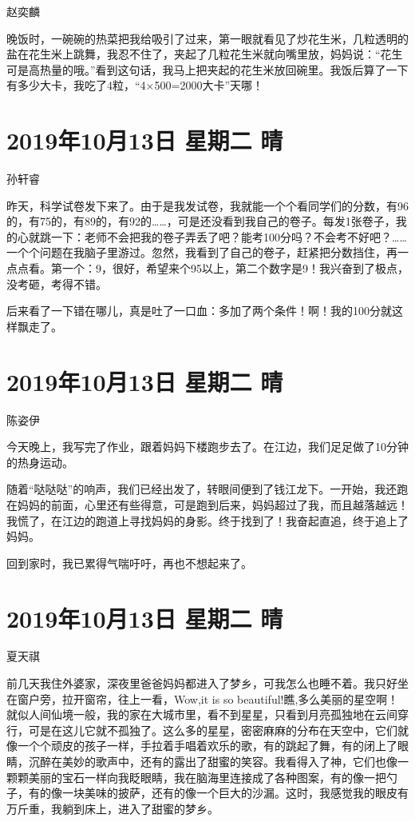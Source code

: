 赵奕麟

晚饭时，一碗碗的热菜把我给吸引了过来，第一眼就看见了炒花生米，几粒透明的盐在花生米上跳舞，我忍不住了，夹起了几粒花生米就向嘴里放，妈妈说：``花生可是高热量的哦。''看到这句话，我马上把夹起的花生米放回碗里。我饭后算了一下有多少大卡，我吃了4粒，``4×500=2000大卡''天哪！

\section{2019年10月13日 星期二 晴}

孙轩睿

昨天，科学试卷发下来了。由于是我发试卷，我就能一个个看同学们的分数，有96的，有75的，有89的，有92的\ldots\ldots，可是还没看到我自己的卷子。每发1张卷子，我的心就跳一下：老师不会把我的卷子弄丢了吧？能考100分吗？不会考不好吧？\ldots\ldots 一个个问题在我脑子里游过。忽然，我看到了自己的卷子，赶紧把分数挡住，再一点点看。第一个：9，很好，希望来个95以上，第二个数字是9！我兴奋到了极点，没考砸，考得不错。

后来看了一下错在哪儿，真是吐了一口血：多加了两个条件！啊！我的100分就这样飘走了。

\section{2019年10月13日 星期二 晴}

陈姿伊

今天晚上，我写完了作业，跟着妈妈下楼跑步去了。在江边，我们足足做了10分钟的热身运动。

随着``哒哒哒''的响声，我们已经出发了，转眼间便到了钱江龙下。一开始，我还跑在妈妈的前面，心里还有些得意，可是跑到后来，妈妈超过了我，而且越落越远！我慌了，在江边的跑道上寻找妈妈的身影。终于找到了！我奋起直追，终于追上了妈妈。

回到家时，我已累得气喘吁吁，再也不想起来了。

\section{2019年10月13日 星期二 晴}

夏天祺

前几天我住外婆家，深夜里爸爸妈妈都进入了梦乡，可我怎么也睡不着。我只好坐在窗户旁，拉开窗帘，往上一看，Wow,it
is so
beautiful!瞧,多么美丽的星空啊！就似人间仙境一般，我的家在大城市里，看不到星星，只看到月亮孤独地在云间穿行，可是在这儿它就不孤独了。这么多的星星，密密麻麻的分布在天空中，它们就像一个个顽皮的孩子一样，手拉着手唱着欢乐的歌，有的跳起了舞，有的闭上了眼睛，沉醉在美妙的歌声中，还有的露出了甜蜜的笑容。我看得入了神，它们也像一颗颗美丽的宝石一样向我眨眼睛，我在脑海里连接成了各种图案，有的像一把勺子，有的像一块美味的披萨，还有的像一个巨大的沙漏。这时，我感觉我的眼皮有万斤重，我躺到床上，进入了甜蜜的梦乡。

